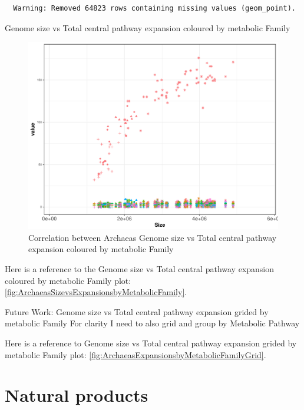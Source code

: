 \documentclass[12pt,twoside]{reedthesis}
\begin{document}
  \begin{verbatim}
  Warning: Removed 64823 rows containing missing values (geom_point).
  \end{verbatim}
  
  Genome size vs Total central pathway expansion coloured by metabolic
  Family
  
  \begin{figure}[h!tbp]
  \centering
  \includegraphics[angle = 0,scale = 0.6]{chapter3/ArchaeasSizevsExpansionsbyMetabolicFamily.pdf}
  \caption[Correlation between Archaeas Genome size vs Total central pathway expansion coloured by metabolic Family]{\normalsize{Correlation between Archaeas Genome size vs Total central pathway expansion coloured by metabolic Family}}
  \label{fig:ArchaeasSizevsExpansionsbyMetabolicFamily}
  \end{figure}
  
  Here is a reference to the Genome size vs Total central pathway
  expansion coloured by metabolic Family plot:
  \autoref{fig:ArchaeasSizevsExpansionsbyMetabolicFamily}. \clearpage 
  
  Future Work: Genome size vs Total central pathway expansion grided by
  metabolic Family For clarity I need to also grid and group by Metabolic
  Pathway
  
  Here is a reference to Genome size vs Total central pathway expansion
  grided by metabolic Family plot:
  \autoref{fig:ArchaeasExpansionsbyMetabolicFamilyGrid}. \clearpage 
  
  \section{Natural products}\label{natural-products}
  
\end{document}
